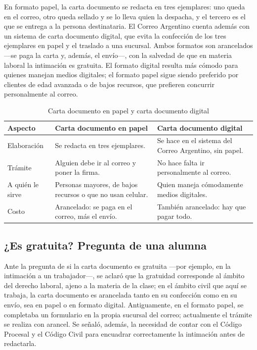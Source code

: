 \documentclass[12pt,oneside]{book}
\begin{document}
En formato papel, la carta documento se redacta en tres ejemplares: uno queda en el correo, otro queda sellado y se lo lleva quien la despacha, y el tercero es el que se entrega a la persona destinataria. El Correo Argentino cuenta además con un sistema de carta documento digital, que evita la confección de los tres ejemplares en papel y el traslado a una sucursal. Ambos formatos son arancelados —se paga la carta y, además, el envío—, con la salvedad de que en materia laboral la intimación es gratuita. El formato digital resulta más cómodo para quienes manejan medios digitales; el formato papel sigue siendo preferido por clientes de edad avanzada o de bajos recursos, que prefieren concurrir personalmente al correo.

\begin{table}[H]
\centering
\caption{Carta documento en papel y carta documento digital}
\begin{tabular}{@{}p{2.3cm}p{5.7cm}p{5.7cm}@{}}
\toprule
\textbf{Aspecto} & \textbf{Carta documento en papel} & \textbf{Carta documento digital} \\
\midrule
Elaboración & Se redacta en tres ejemplares. & Se hace en el sistema del Correo Argentino, sin papel. \\
Trámite & Alguien debe ir al correo y poner la firma. & No hace falta ir personalmente al correo. \\
A quién le sirve & Personas mayores, de bajos recursos o que no usan celular. & Quien maneja cómodamente medios digitales. \\
Costo & Arancelado: se paga en el correo, más el envío. & También arancelado: hay que pagar todo. \\
\bottomrule
\end{tabular}
\end{table}

\subsection*{¿Es gratuita? Pregunta de una alumna}

Ante la pregunta de si la carta documento es gratuita —por ejemplo, en la intimación a un trabajador—, se aclaró que la gratuidad corresponde al ámbito del derecho laboral, ajeno a la materia de la clase; en el ámbito civil que aquí se trabaja, la carta documento es arancelada tanto en su confección como en su envío, sea en papel o en formato digital. Antiguamente, en el formato papel, se completaba un formulario en la propia sucursal del correo; actualmente el trámite se realiza con arancel. Se señaló, además, la necesidad de contar con el Código Procesal y el Código Civil para encuadrar correctamente la intimación antes de redactarla.
\end{document}
